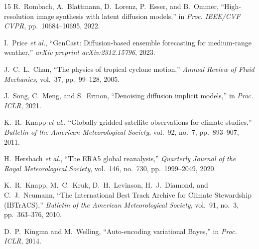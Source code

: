 \begin{thebibliography}{15}
R.~Rombach, A.~Blattmann, D.~Lorenz, P.~Esser, and B.~Ommer, ``High-resolution image synthesis with latent diffusion models,'' in \textit{Proc. IEEE/CVF CVPR}, pp.~10684--10695, 2022.

I.~Price \textit{et al.}, ``GenCast: Diffusion-based ensemble forecasting for medium-range weather,'' \textit{arXiv preprint arXiv:2312.15796}, 2023.

J.~C.~L.~Chan, ``The physics of tropical cyclone motion,'' \textit{Annual Review of Fluid Mechanics}, vol.~37, pp.~99--128, 2005.

J.~Song, C.~Meng, and S.~Ermon, ``Denoising diffusion implicit models,'' in \textit{Proc. ICLR}, 2021.

K.~R.~Knapp \textit{et al.}, ``Globally gridded satellite observations for climate studies,'' \textit{Bulletin of the American Meteorological Society}, vol.~92, no.~7, pp.~893--907, 2011.

H.~Hersbach \textit{et al.}, ``The ERA5 global reanalysis,'' \textit{Quarterly Journal of the Royal Meteorological Society}, vol.~146, no.~730, pp.~1999--2049, 2020.

K.~R.~Knapp, M.~C.~Kruk, D.~H.~Levinson, H.~J.~Diamond, and C.~J.~Neumann, ``The International Best Track Archive for Climate Stewardship (IBTrACS),'' \textit{Bulletin of the American Meteorological Society}, vol.~91, no.~3, pp.~363--376, 2010.

D.~P.~Kingma and M.~Welling, ``Auto-encoding variational Bayes,'' in \textit{Proc. ICLR}, 2014.

\end{thebibliography}
